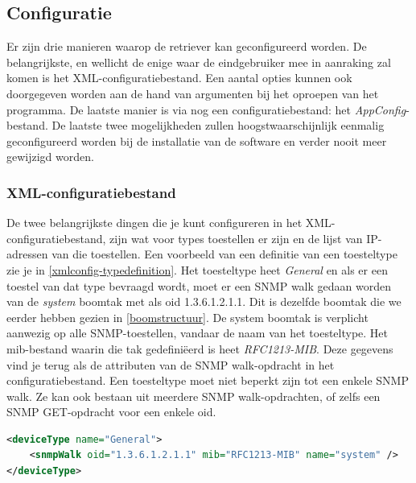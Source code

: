 \subsection{Configuratie}
\label{snmp-data-retriever-configuratie}
Er zijn drie manieren waarop de retriever kan geconfigureerd worden. De belangrijkste,
en wellicht de enige waar de eindgebruiker mee in aanraking zal komen is het XML-configuratiebestand.
Een aantal opties kunnen ook doorgegeven worden aan de hand van argumenten bij het oproepen van het programma.
De laatste manier is via nog een configuratiebestand: het \emph{AppConfig}-bestand. De laatste twee mogelijkheden
zullen hoogstwaarschijnlijk eenmalig geconfigureerd worden bij de installatie van de software en verder nooit meer gewijzigd worden.



\subsubsection{XML-configuratiebestand}

De twee belangrijkste dingen die je kunt configureren in het XML-configuratiebestand, zijn wat voor types toestellen er zijn en de lijst van IP-adressen van die toestellen.
Een voorbeeld van een definitie van een toesteltype zie je in \cref{xmlconfig-typedefinition}.
Het toesteltype heet \emph{General} en als er een toestel van dat type bevraagd wordt,
moet er een SNMP walk gedaan worden van de \textit{system} boomtak met als \gls{oid} 1.3.6.1.2.1.1.
Dit is dezelfde boomtak die we eerder hebben gezien in \cref{boomstructuur}.
De system boomtak is verplicht aanwezig op alle SNMP-toestellen, vandaar de naam van het toesteltype.
Het \gls{mib}-bestand waarin die tak gedefiniëerd is heet \emph{RFC1213-MIB}.
Deze gegevens vind je terug als de attributen van de SNMP walk-opdracht in het configuratiebestand.
Een toesteltype moet niet beperkt zijn tot een enkele SNMP walk. Ze kan ook bestaan uit meerdere SNMP walk-opdrachten,
of zelfs een SNMP GET-opdracht voor een enkele \gls{oid}.

\begin{lstlisting}[language=XML, float=h, caption={Definitie van een toesteltype in het XML-configuratiebestand}, label=xmlconfig-typedefinition]
<deviceType name="General">
	<snmpWalk oid="1.3.6.1.2.1.1" mib="RFC1213-MIB" name="system" />
</deviceType>
\end{lstlisting}

